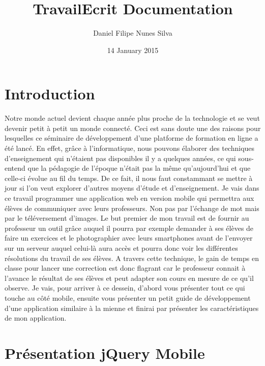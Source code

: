 \documentclass[letterpaper,10pt,french]{sphinxmanual}
\title{TravailEcrit Documentation}
\date{14 January 2015}
\author{Daniel Filipe Nunes Silva}
\begin{document}
\maketitle
\tableofcontents
{}\label{index::doc}



\chapter{Introduction}
\label{intro:introduction}\label{intro:welcome-to-travailecrit-s-documentation}\label{intro::doc}
Notre monde actuel devient chaque année plus proche de la technologie et se veut
devenir petit à petit un monde connecté. Ceci est sans doute une des raisons
pour lesquelles ce séminaire de développement d'une platforme de formation
en ligne a été lancé. En effet, grâce à l'informatique, nous pouvons élaborer
des techniques d'enseignement qui n'étaient pas disponibles il y a quelques
années, ce qui sous-entend que la pédagogie de l'époque n'était pas la même qu'aujourd'hui et que
celle-ci évolue au fil du temps. De ce fait, il nous faut constammant se mettre à jour si l'on
veut explorer d'autres moyens d'étude et d'enseignement. Je vais dans ce travail
programmer une application web en version mobile qui permettra aux élèves de
communiquer avec leurs professeurs. Non pas par l'échange de mot mais par le
téléversement d'images. Le but premier de mon travail est de fournir au professeur
un outil grâce auquel il pourra par exemple demander à ses élèves de faire un
exercices et le photographier avec leurs smartphones avant de l'envoyer sur un serveur auquel celui-là
aura accès et pourra donc voir les différentes résolutions du travail de ses élèves.
A travers cette technique, le gain de temps en classe pour lancer une correction
est donc flagrant car le professeur connait à l'avance le résultat de ses élèves
et peut adapter son cours en mesure de ce qu'il observe. Je vais, pour arriver à
ce dessein, d'abord vous présenter tout ce qui touche au côté mobile, ensuite
vous présenter un petit guide de développement d'une application similaire à la
mienne et finirai par présenter les caractéristiques de mon application.


\chapter{Présentation jQuery Mobile}
\label{presentation_jQM:presentation-jquery-mobile}\label{presentation_jQM::doc}
\end{document}
